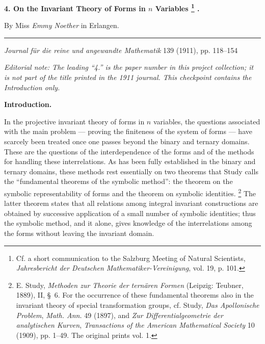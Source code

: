 \documentclass[11pt]{article}
\newcommand{\NoetherSrcNote}[2]{%
  \begingroup
  \renewcommand{\thefootnote}{\ensuremath{[\mathrm{#1}]}}%
  \footnote{#2}%
  \endgroup
}
\begin{document}
\begin{center}
{\Large\bfseries 4. On the Invariant Theory of Forms in $n$ Variables\NoetherSrcNote{118:*}{Cf. a short communication to the Salzburg Meeting of Natural Scientists, \emph{Jahresbericht der Deutschen Mathematiker-Vereinigung}, vol. 19, p. 101.}.}\par
\vspace{0.5em}
By Miss \emph{Emmy Noether} in Erlangen.\par
\medskip
\rule{0.22\linewidth}{0.4pt}\par
\vspace{0.7em}
\emph{Journal f\"ur die reine und angewandte Mathematik} 139 (1911), pp. 118--154
\par\smallskip
{\small\itshape Editorial note: The leading ``4.'' is the paper number in this project collection; it is not part of the title printed in the 1911 journal. This checkpoint contains the Introduction only.}
\end{center}

\begin{center}
\textbf{Introduction.}
\end{center}

In the projective invariant theory of forms in $n$ variables, the questions associated with the main problem --- proving the finiteness of the system of forms --- have scarcely been treated once one passes beyond the binary and ternary domains. These are the questions of the interdependence of the forms and of the methods for handling these interrelations. As has been fully established in the binary and ternary domains, these methods rest essentially on two theorems that Study calls the ``fundamental theorems of the symbolic method'': the theorem on the symbolic representability of forms and the theorem on symbolic identities.\NoetherSrcNote{118:**}{E. Study, \emph{Methoden zur Theorie der tern\"aren Formen} (Leipzig: Teubner, 1889), II, \S\ 6. For the occurrence of these fundamental theorems also in the invariant theory of special transformation groups, cf. Study, \emph{Das Apollonische Problem}, \emph{Math. Ann.} 49 (1897), and \emph{Zur Differentialgeometrie der analytischen Kurven}, \emph{Transactions of the American Mathematical Society} 10 (1909), pp. 1--49. The original prints vol. 1.} The latter theorem states that all relations among integral invariant constructions are obtained by successive application of a small number of symbolic identities; thus the symbolic method, and it alone, gives knowledge of the interrelations among the forms without leaving the invariant domain.
\end{document}
